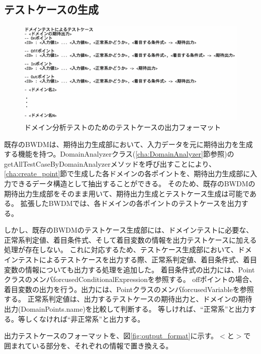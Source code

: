 \documentclass[uplatex, report, a4j, 10pt]{jsbook}
\begin{document}
\subsection{テストケースの生成}
\begin{figure}[tp]
  \centering
  \includegraphics[keepaspectratio, width=160mm]{figs/dmin_output_format}
  \caption{ドメイン分析テストのためのテストケースの出力フォーマット}
  \label{fig:dmin_output_format}
\end{figure}

既存のBWDMは、期待出力生成部において、入力データを元に期待出力を生成する機能を持つ。DomainAnalyzerクラス(\ref{cha:DomainAnalyzer}節参照)のgetAllTestCaseByDomainAnalyzerメソッドを呼び出すことにより、\ref{cha:create_point}節で生成した各ドメインの各ポイントを、期待出力生成部に入力できるデータ構造として抽出することができる。
そのため、既存のBWDMの期待出力生成部をそのまま用いて、期待出力生成とテストケース生成は可能である。
拡張したBWDMでは、各ドメインの各ポイントのテストケースを出力する。

しかし、既存のBWDMのテストケース生成部には、ドメインテストに必要な、正常系判定値、着目条件式、そして着目変数の情報を出力テストケースに加える処理が存在しない。
これに対応するため、テストケース生成部において、ドメインテストによるテストケースを出力する際、正常系判定値、着目条件式、着目変数の情報についても出力する処理を追加した。
着目条件式の出力には、PointクラスのメンバforcusedConditionalExpressionを参照する。
offポイントの場合、着目変数の出力を行う。出力には、PointクラスのメンバforcusedVariableを参照する。
正常系判定値は、出力するテストケースの期待出力と、ドメインの期待出力(DomainPoints.name)を比較して判断する。
等しければ、“正常系”と出力する。等しくなければ“非正常系”と出力する。

出力テストケースのフォーマットを、図\ref{fig:output_format}に示す。$<$と$>$で囲まれている部分を、それぞれの情報で置き換える。
\end{document}
